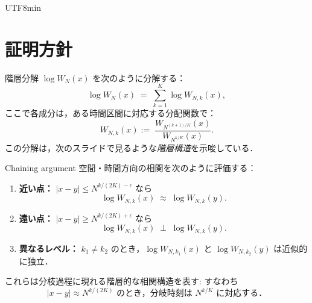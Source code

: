 \documentclass{beamer}
\begin{document}
\begin{CJK*}{UTF8}{min}
\section{証明方針}

\begin{frame}{階層分解}
\small
$\log W_N(x)$ を次のように分解する：
\[
    \log W_N(x) \;=\; \sum_{k=1}^K \log W_{N,k}(x),
\]
ここで各成分は，ある時間区間に対応する分配関数で：
\[
    W_{N,k}(x) 
    :=\; 
    \frac{W_{N^{(k+1)/K}}(x)}{W_{N^{k/K}}(x)}.
\]
この分解は，次のスライドで見るような\emph{階層構造}を示唆している．
\end{frame}

\begin{frame}{Chaining argument}
\small
空間・時間方向の相関を次のように評価する：
\begin{enumerate}
    \item \textbf{近い点：} $|x-y| \le N^{k/(2K) - \epsilon}$ なら
\[
       \log W_{N,k}(x) \;\approx\; \log W_{N,k}(y).
\]
    \item \textbf{遠い点：} $|x-y| \ge N^{k/(2K) + \epsilon}$ なら
\[
       \log W_{N,k}(x) \;\perp\; \log W_{N,k}(y).
\]
    \item \textbf{異なるレベル：} $k_1 \neq k_2$ のとき，$\log W_{N,k_1}(x)$ と $\log W_{N,k_2}(y)$ は近似的に独立．
\end{enumerate}
これらは分枝過程に現れる階層的な相関構造を表す: すなわち
$$\text{$|x-y| \approx N^{k/(2K)}$ のとき，分岐時刻は $N^{k/K}$ に対応する．}$$
\end{frame}


\end{CJK*}
\end{document}
